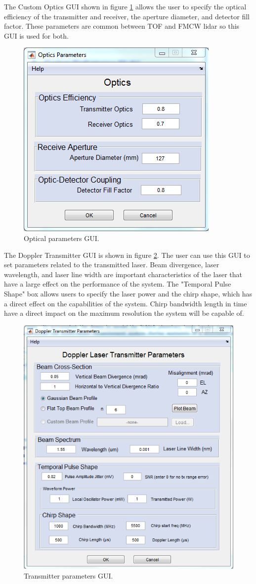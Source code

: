 The Custom Optics GUI shown in figure \ref{fig:opticsGUI} allows the user to specify the optical efficiency of the transmitter
and receiver, the aperture diameter, and detector fill factor. These parameters are common between TOF and FMCW lidar so this 
GUI is used for both. 
\begin{figure}[!htb]
	\centering
	\includegraphics[width=.6\columnwidth]{figs/opticsGUI}
	\vspace{1em}
	\caption{Optical parameters GUI.}
	\label{fig:opticsGUI}
\end{figure}  

The Doppler Transmitter GUI is shown in figure \ref{fig:dopTXGUI}. The user can use this GUI to set parameters related to 
the transmitted laser. Beam divergence, laser wavelength, and laser line width are important characteristics of the laser that 
have a large effect on the performance of the system. The "Temporal Pulse Shape" box allows users to specify the laser power and 
the chirp shape, which has a direct effect on the capabilities of the system. Chirp bandwidth length in time have a
direct impact on the maximum resolution the system will be capable of.  
\begin{figure}[!htb]
	\centering
	\includegraphics[width=.6\columnwidth]{figs/dopTxGUI}
	\vspace{1em}
	\caption{Transmitter parameters GUI.}
	\label{fig:dopTXGUI}
\end{figure}  

